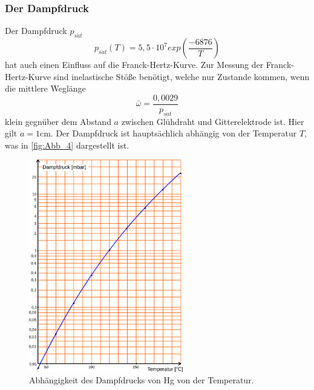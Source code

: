 \subsubsection{Der Dampfdruck}
\label{subsubsec:Dampfdruck}
Der Dampfdruck $p_{s\ddot{a}t}$
\begin{equation}
    p_{s\ddot{a}t}(T) = 5,5 \cdot 10^7 exp(\frac{-6876}{T})
    \label{eqn:psät}
\end{equation}
hat auch einen Einfluss auf die Franck-Hertz-Kurve. Zur Messung der Franck-Hertz-Kurve sind inelastische Stöße benötigt,
welche nur Zustande kommen, wenn die mittlere Weglänge
\begin{equation}
    \bar{\omega} = \frac{0,0029}{p_{s\ddot{a}t}}
    \label{eqn:Weglänge}
\end{equation}
klein gegnüber dem Abstand $a$ zwischen Glühdraht und Gitterelektrode ist. Hier gilt $a = 1 \si{\centi\meter}$.
Der Dampfdruck ist hauptsächlich abhängig von der Temperatur $T$, was in \autoref{fig:Abb_4} dargestellt ist.
\begin{figure}[H]
    \centering
    \includegraphics[width=0.6\textwidth]{build/Abb_4.png}
    \caption{Abhängigkeit des Dampfdrucks von Hg von der Temperatur\cite{V601}.}
    \label{fig:Abb_4}
\end{figure}
